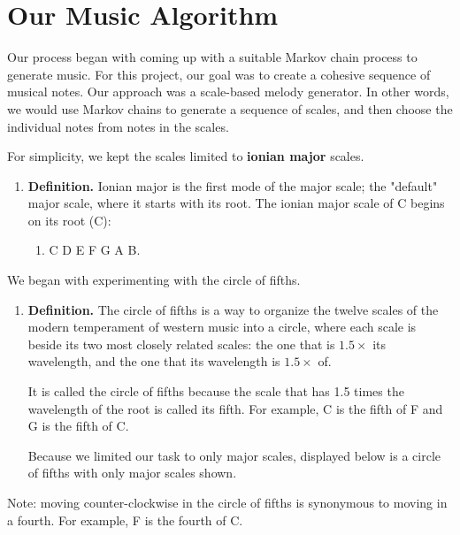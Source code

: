 \documentclass{article}
\begin{document}
\pagebreak

\section{Our Music Algorithm}

\noindent Our process began with coming up with a suitable Markov chain process to generate music. For this project, our goal was to create a cohesive sequence of musical notes. Our approach was a scale-based melody generator. In other words, we would use Markov chains to generate a sequence of scales, and then choose the individual notes from notes in the scales.

For simplicity, we kept the scales limited to \textbf{ionian major} scales. 

\begin{enumerate}[label=]
    \item \textbf{Definition.} Ionian major is the first mode of the major scale; the "default" major scale, where it starts with its root. The ionian major scale of C begins on its root (C): 
    
    \begin{enumerate}[label=]
        \item C D E F G A B.
    \end{enumerate}
\end{enumerate}

We began with experimenting with the circle of fifths.

\begin{enumerate}[label=]
    \item \textbf{Definition.} The circle of fifths is a way to organize the twelve  scales of the modern temperament of western music into a circle, where each scale is beside its two most closely related scales: the one that is $1.5\times$ its wavelength, and the one that its wavelength is $1.5\times$ of. 

    It is called the circle of fifths because the scale that has 1.5 times the wavelength of the root is called its fifth. For example, C is the fifth of F and G is the fifth of C.

    Because we limited our task to only major scales, displayed below is a circle of fifths with only major scales shown.
\end{enumerate}

Note: moving counter-clockwise in the circle of fifths is synonymous to moving in a fourth. For example, F is the fourth of C. 
\end{document}
